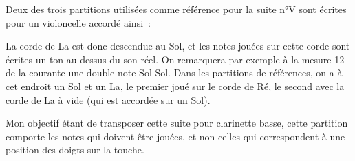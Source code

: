 \documentclass[a4paper,twoside]{article}
\begin{document}
Deux des trois partitions utilisées comme référence pour la suite n°V sont écrites 
pour un violoncelle accordé ainsi~:

\smallskip
La corde de La est donc descendue au Sol, et les notes jouées sur cette corde sont 
écrites un ton au-dessus du son réel. On remarquera par exemple à la mesure 12 de 
la courante une double note Sol-Sol. Dans les partitions de références, on a à cet 
endroit un Sol et un La, le premier joué sur le corde de Ré, le second avec la corde
de La à vide (qui est accordée sur un Sol).

\medskip

Mon objectif étant de transposer cette suite pour clarinette basse, cette partition 
comporte les notes qui doivent être jouées, et non celles qui correspondent à une 
position des doigts sur la touche.
\end{document}
